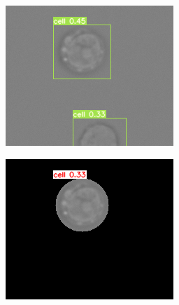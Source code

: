 \begin{figure}[h]
	\begin{center}
		\begin{subfigure}[b]{0.25\textwidth}
		    \centering
			\includegraphics[width=\textwidth]{thesis-template-master/images/gbciou1.png}
			\caption{}
			\label{fig:cellnet}
		\end{subfigure}
		\begin{subfigure}[b]{0.25\textwidth}
		    \centering
			\includegraphics[width=\textwidth]{thesis-template-master/images/gbciou2.png}

\end{subfigure}
\end{center}
\end{figure}
